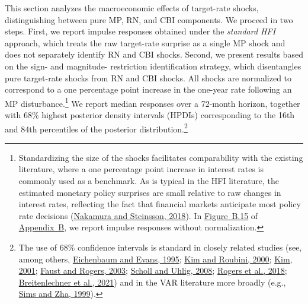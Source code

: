 \documentclass[12pt, reqno]{article}
\begin{document}
This section analyzes the macroeconomic effects of target-rate shocks, distinguishing between pure MP, RN, and CBI components. We proceed in two steps. First, we report impulse responses obtained under the \emph{standard HFI} approach, which treats the raw target-rate surprise as a single MP shock and does not separately identify RN and CBI shocks. Second, we present results based on the sign- and magnitude-
restriction identification strategy, which disentangles pure target-rate shocks from RN and CBI shocks. All shocks are normalized to correspond to a one percentage point increase in the one-year rate following an MP disturbance.\footnote{Standardizing the size of the shocks facilitates comparability with the existing literature, where a one percentage point increase in interest rates is commonly used as a benchmark. As is typical in the HFI literature, the estimated monetary policy surprises are small relative to raw changes in interest rates, reflecting the fact that financial markets anticipate most policy rate decisions (\hyperlink{Nakamura and Steinsson (2018)}{Nakamura and Steinsson, 2018}). In \hyperlink{Figure B.15}{Figure~B.15} of \hyperlink{Appendix B}{Appendix~B}, we report impulse responses without normalization.} We report median responses over a 72-month horizon, together with 68\% highest posterior density intervals (HPDIs) corresponding to the 16th and 84th percentiles of the posterior distribution.\footnote{The use of 68\% confidence intervals is standard in closely related studies (see, among others, \hyperlink{Eichenbaum and Evans (1995)}{Eichenbaum and Evans, 1995}; \hyperlink{Kim and Roubini (2000)}{Kim and Roubini, 2000}; \hyperlink{Kim (2001)}{Kim, 2001}; \hyperlink{Faust and Rogers (2003)}{Faust and Rogers, 2003}; \hyperlink{Scholl and Uhlig (2008)}{Scholl and Uhlig, 2008}; \hyperlink{Rogers et al. (2018)}{Rogers et al., 2018}; \hyperlink{Breitenlechner et al. (2021)}{Breitenlechner et al., 2021}) and in the VAR literature more broadly (e.g., \hyperlink{Sims and Zha (1999)}{Sims and Zha, 1999}).}
\end{document}
